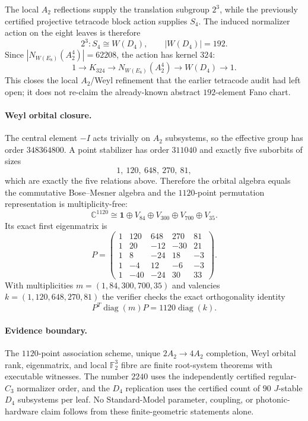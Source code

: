 The local $A_2$ reflections supply the translation subgroup $2^3$, while the
previously certified projective tetracode block action supplies $S_4$.  The induced
normalizer action on the eight leaves is therefore
\[
\boxed{2^3{:}S_4\cong W(D_4),\qquad |W(D_4)|=192.}
\]
Since $|N_{W(E_8)}(A_2^4)|=62208$, the action has kernel $324$:
\[
\boxed{1\longrightarrow K_{324}\longrightarrow N_{W(E_8)}(A_2^4)
\longrightarrow W(D_4)\longrightarrow1.}
\]
This closes the local $A_2$/Weyl refinement that the earlier tetracode audit had
left open; it does not re-claim the already-known abstract $192$-element Fano chart.

\paragraph{Weyl orbital closure.}
The central element $-I$ acts trivially on $A_2$ subsystems, so the effective group
has order $348364800$.  A point stabilizer has order $311040$ and exactly five
suborbits of sizes
\[
\boxed{1,\ 120,\ 648,\ 270,\ 81,}
\]
which are exactly the five relations above.  Therefore the orbital algebra equals
the commutative Bose--Mesner algebra and the $1120$-point permutation representation
is multiplicity-free:
\[
\boxed{\mathbb C^{1120}\cong\mathbf 1\oplus V_{84}\oplus V_{300}\oplus V_{700}\oplus V_{35}.}
\]
Its exact first eigenmatrix is
\[
\boxed{
P=\begin{pmatrix}
1&120&648&270&81\\
1&20&-12&-30&21\\
1&8&-24&18&-3\\
1&-4&12&-6&-3\\
1&-40&-24&30&33
\end{pmatrix}.}
\]
With multiplicities $m=(1,84,300,700,35)$ and valencies
$k=(1,120,648,270,81)$ the verifier checks the exact orthogonality identity
\[
P^{T}\operatorname{diag}(m)P=1120\operatorname{diag}(k).
\]

\paragraph{Evidence boundary.}
The $1120$-point association scheme, unique $2A_2\to4A_2$ completion, Weyl orbital
rank, eigenmatrix, and local $\mathbb F_2^3$ fibre are finite root-system theorems
with executable witnesses.  The number $2240$ uses the independently certified
regular-$C_3$ normalizer order, and the $D_4$ replication uses the certified count of
$90$ $J$-stable $D_4$ subsystems per leaf.  No Standard-Model parameter, coupling,
or photonic-hardware claim follows from these finite-geometric statements alone.
